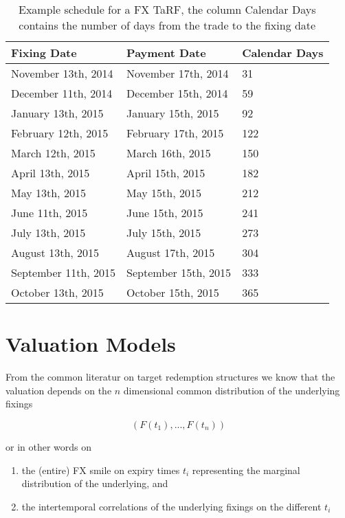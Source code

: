 \documentclass{amsart}
\theoremstyle{plain}
\numberwithin{equation}{section}
\begin{document}
\begin{table}[ht]
\caption{Example schedule for a FX TaRF, the column Calendar Days contains the number of days from the trade to the fixing date}
\begin{tabular}{l | l | l}
Fixing Date & Payment Date & Calendar Days \\ \hline
November 13th, 2014 & November 17th, 2014 & 31 \\
December 11th, 2014 & December 15th, 2014 & 59 \\
January 13th, 2015 & January 15th, 2015 & 92 \\
February 12th, 2015 & February 17th, 2015 & 122 \\
March 12th, 2015 & March 16th, 2015 & 150 \\
April 13th, 2015 & April 15th, 2015 & 182 \\
May 13th, 2015 & May 15th, 2015 & 212 \\
June 11th, 2015 & June 15th, 2015 & 241 \\
July 13th, 2015 & July 15th, 2015 & 273 \\
August 13th, 2015 & August 17th, 2015 & 304 \\
September 11th, 2015 & September 15th, 2015 & 333 \\
October 13th, 2015 & October 15th, 2015 & 365
\end{tabular}
\label{schedule}
\end{table}

\section{Valuation Models}

From the common literatur on target redemption structures we know that the valuation depends on the $n$ dimensional common distribution of the underlying fixings

\begin{equation}
(F(t_1), ... , F(t_n))
\end{equation}

or in other words on

\begin{enumerate}
\item the (entire) FX smile on expiry times $t_i$ representing the marginal distribution of the underlying, and
\item the intertemporal correlations of the underlying fixings on the different $t_i$
\end{enumerate}
\end{document}
